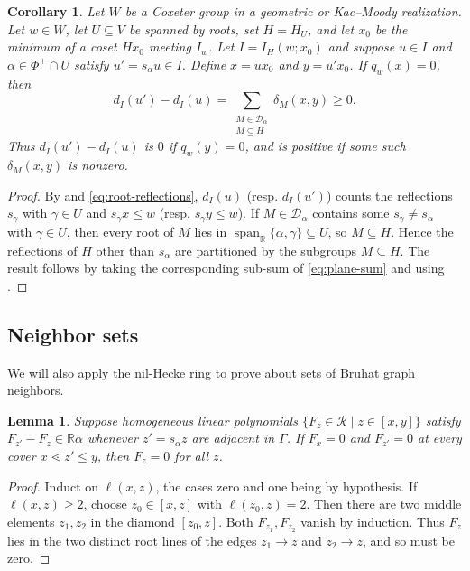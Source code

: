 \documentclass[11pt]{amsart}
\newtheorem{lemma}[lemma]{Lemma}
\newtheorem{corollary}[corollary]{Corollary}
\theoremstyle{definition}
\theoremstyle{remark}
\numberwithin{equation}{section}
\newcommand{\R}{\mathbb R}
\DeclareMathOperator{\Span}{span}
\begin{document}
\begin{corollary}\label{cor:internal}
Let $W$ be a Coxeter group in a geometric or Kac--Moody
realization. Let $w\in W$,
let $U\subseteq V$ be spanned by roots, set $H=H_U$, and
let $x_0$ be the minimum of a coset $Hx_0$ meeting $I_w$.
Let $I=I_H(w;x_0)$ and suppose $u\in I$ and $\alpha\in\Phi^+\cap U$ satisfy $u'=s_\alpha u\in I$.
Define $x=ux_0$ and $y=u'x_0$. If $q_w(x)=0$, then
\[
 d_I(u')-d_I(u)=\sum_{\substack{M \in \mathcal{D}_\alpha \\ M\subseteq H}}\delta_M(x,y)\ge0.
\]
Thus $d_I(u')-d_I(u)$ is $0$ if $q_w(y)=0$, and is positive
if some such $\delta_M(x,y)$ is nonzero.
\end{corollary}
\begin{proof}
By  and \eqref{eq:root-reflections}, $d_I(u)$ (resp. $d_I(u')$) counts the
reflections $s_\gamma$ with $\gamma\in U$ and $s_\gamma x\le w$ (resp.
$s_\gamma y\le w$). If $M \in \mathcal{D}_\alpha$ contains some $s_\gamma\ne s_\alpha$
with $\gamma\in U$, then every root of $M$ lies in $\Span_\R\{\alpha,\gamma\}\subseteq U$,
so $M\subseteq H$. Hence the reflections of $H$ other than $s_\alpha$ are partitioned by
the subgroups $M\subseteq H$. The result follows by taking the corresponding sub-sum of \eqref{eq:plane-sum}
and using .
\end{proof}

\subsection{Neighbor sets} We will also apply the nil-Hecke ring to prove  about sets of Bruhat graph neighbors. 

\begin{lemma}\label{lem:linear-section}
Suppose homogeneous linear polynomials $\{F_z\in\mathcal{R} \mid z\in[x,y]\}$ satisfy
$F_{z'}-F_z\in\R\alpha$ whenever $z'=s_\alpha z$ are adjacent in $\Gamma$. If $F_x=0$ and $F_{z'}=0$ at every cover
$x\lessdot z'\le y$, then $F_z=0$ for all $z$.
\end{lemma}
\begin{proof}
Induct on $\ell(x,z)$, the cases zero and one being by hypothesis.
If $\ell(x,z) \geq 2$, choose $z_0\in[x,z]$ with $\ell(z_0,z)=2$. 
Then there are two middle elements $z_1,z_2$ in the diamond $[z_0,z]$. Both $F_{z_1},F_{z_2}$ vanish
by induction. Thus $F_z$ lies in the two distinct root lines of
the edges $z_1 \to z$ and $z_2 \to z$, and so must be zero.
\end{proof}
\end{document}

